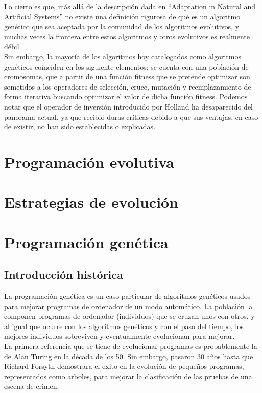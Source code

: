 \documentclass[12pt]{article} \usepackage[utf8x]{inputenc}
\begin{document}
Lo cierto es que, más allá de la descripción dada en ``Adaptation in
Natural and Artificial Systems'' no existe una definición rigurosa de
qué es un algoritmo genético que sea aceptada por la comunidad de los
algoritmos evolutivos, y muchas veces la frontera entre estos
algoritmos y otros evolutivos es
realmente débil. \\

Sin embargo, la mayoría de los algoritmos hoy catalogados como
algoritmos genéticos coinciden en los siguiente elementos: se cuenta
con una población de cromosomas, que a partir de una función fitness
que se pretende optimizar son sometidos a los operadores de selección,
cruce, mutación y reemplazamiento de forma iterativa buscando
optimizar el valor de dicha función fitness.  Podemos notar que el
operador de inversión introducido por Holland ha desaparecido del
panorama actual, ya que recibió duras críticas debido a que sus
ventajas, en caso de existir, no han
sido establecidas o explicadas.\\


\section{Programación evolutiva}

\section{Estrategias de evolución}

\section{Programación genética}


\subsection{Introducción histórica}

La programación genética es un caso particular de algoritmos genéticos
usados para mejorar programas de ordenador de un modo automático.  La
población la componen programas de ordenador (individuos) que se
cruzan unos con otros, y al igual que ocurre con los algoritmos
genéticos y con el paso del tiempo, los mejores individuos sobreviven
y eventualmente evolucionan para mejorar. \\

La primera referencia que se tiene de evolucionar programas es
probablemente la de Alan Turing en la década de los 50. Sin embargo,
pasaron 30 años hasta que Richard Forsyth demostrara el exito en la
evolución de pequeños programas, representados como arboles,
para mejorar la clasificación de las pruebas de una escena de crimen.\\
\end{document}
